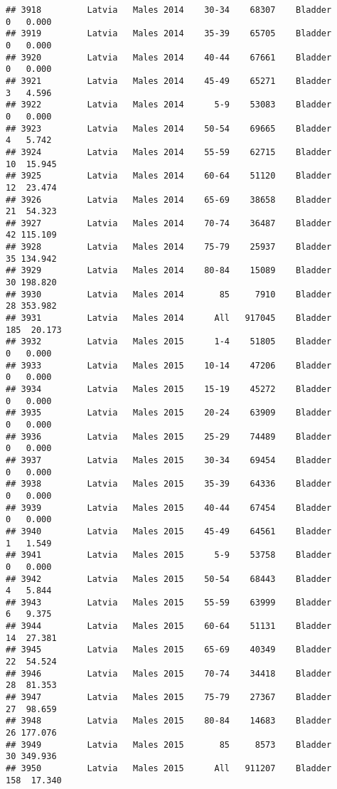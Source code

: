 \documentclass[
]{article}
\begin{document}
\begin{verbatim}
## 3918         Latvia   Males 2014    30-34    68307    Bladder      0   0.000
## 3919         Latvia   Males 2014    35-39    65705    Bladder      0   0.000
## 3920         Latvia   Males 2014    40-44    67661    Bladder      0   0.000
## 3921         Latvia   Males 2014    45-49    65271    Bladder      3   4.596
## 3922         Latvia   Males 2014      5-9    53083    Bladder      0   0.000
## 3923         Latvia   Males 2014    50-54    69665    Bladder      4   5.742
## 3924         Latvia   Males 2014    55-59    62715    Bladder     10  15.945
## 3925         Latvia   Males 2014    60-64    51120    Bladder     12  23.474
## 3926         Latvia   Males 2014    65-69    38658    Bladder     21  54.323
## 3927         Latvia   Males 2014    70-74    36487    Bladder     42 115.109
## 3928         Latvia   Males 2014    75-79    25937    Bladder     35 134.942
## 3929         Latvia   Males 2014    80-84    15089    Bladder     30 198.820
## 3930         Latvia   Males 2014       85     7910    Bladder     28 353.982
## 3931         Latvia   Males 2014      All   917045    Bladder    185  20.173
## 3932         Latvia   Males 2015      1-4    51805    Bladder      0   0.000
## 3933         Latvia   Males 2015    10-14    47206    Bladder      0   0.000
## 3934         Latvia   Males 2015    15-19    45272    Bladder      0   0.000
## 3935         Latvia   Males 2015    20-24    63909    Bladder      0   0.000
## 3936         Latvia   Males 2015    25-29    74489    Bladder      0   0.000
## 3937         Latvia   Males 2015    30-34    69454    Bladder      0   0.000
## 3938         Latvia   Males 2015    35-39    64336    Bladder      0   0.000
## 3939         Latvia   Males 2015    40-44    67454    Bladder      0   0.000
## 3940         Latvia   Males 2015    45-49    64561    Bladder      1   1.549
## 3941         Latvia   Males 2015      5-9    53758    Bladder      0   0.000
## 3942         Latvia   Males 2015    50-54    68443    Bladder      4   5.844
## 3943         Latvia   Males 2015    55-59    63999    Bladder      6   9.375
## 3944         Latvia   Males 2015    60-64    51131    Bladder     14  27.381
## 3945         Latvia   Males 2015    65-69    40349    Bladder     22  54.524
## 3946         Latvia   Males 2015    70-74    34418    Bladder     28  81.353
## 3947         Latvia   Males 2015    75-79    27367    Bladder     27  98.659
## 3948         Latvia   Males 2015    80-84    14683    Bladder     26 177.076
## 3949         Latvia   Males 2015       85     8573    Bladder     30 349.936
## 3950         Latvia   Males 2015      All   911207    Bladder    158  17.340

\end{verbatim}
\end{document}
